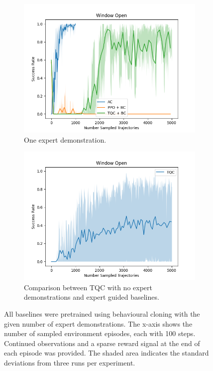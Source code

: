 \begin{figure}[htbp]
\begin{subfigure}[t]{0.45\textwidth}
    \includegraphics[width=\textwidth]{images/dense_1/Window Open.png}
    \caption{One expert demonstration.}
  \end{subfigure}
  \hfill
  \begin{subfigure}[t]{0.45\textwidth}
    \includegraphics[width=\textwidth]{images/TQC_bc_GAIL_vs_ref/Window Open.png}
    \caption{Comparison between TQC with no expert demonstrations and expert guided baselines.}
    \label{fig:TQC_0_vs_exp}
  \end{subfigure}
  \caption{All baselines were pretrained using behavioural cloning with the given number of expert demonstrations. 
    The x-axis shows the number of sampled environment episodes, each with 100 steps. 
    Continued observations and a sparse reward signal at the end of each episode was provided. 
    The shaded area indicates the standard deviations from three runs per experiment.}
    \label{fig:dense_ref}
\end{figure}

